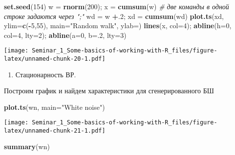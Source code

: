 \documentclass[
]{article}
\newenvironment{Shaded}{\begin{snugshade}}{\end{snugshade}}
\newcommand{\AttributeTok}[1]{\textcolor[rgb]{0.13,0.29,0.53}{#1}}
\newcommand{\CommentTok}[1]{\textcolor[rgb]{0.56,0.35,0.01}{\textit{#1}}}
\newcommand{\DecValTok}[1]{\textcolor[rgb]{0.00,0.00,0.81}{#1}}
\newcommand{\FunctionTok}[1]{\textcolor[rgb]{0.13,0.29,0.53}{\textbf{#1}}}
\newcommand{\NormalTok}[1]{#1}
\newcommand{\OtherTok}[1]{\textcolor[rgb]{0.56,0.35,0.01}{#1}}
\newcommand{\SpecialCharTok}[1]{\textcolor[rgb]{0.81,0.36,0.00}{\textbf{#1}}}
\newcommand{\StringTok}[1]{\textcolor[rgb]{0.31,0.60,0.02}{#1}}
\providecommand{\tightlist}{%
  \setlength{\itemsep}{0pt}\setlength{\parskip}{0pt}}
\begin{document}
\begin{Shaded}
\begin{Highlighting}[]
\FunctionTok{set.seed}\NormalTok{(}\DecValTok{154}\NormalTok{) }
\NormalTok{w }\OtherTok{=} \FunctionTok{rnorm}\NormalTok{(}\DecValTok{200}\NormalTok{); x }\OtherTok{=} \FunctionTok{cumsum}\NormalTok{(w) }\CommentTok{\# две команды в одной строке задаются через ";"}
\NormalTok{wd }\OtherTok{=}\NormalTok{ w }\SpecialCharTok{+}\NormalTok{.}\DecValTok{2}\NormalTok{; xd }\OtherTok{=} \FunctionTok{cumsum}\NormalTok{(wd)}
\FunctionTok{plot.ts}\NormalTok{(xd, }\AttributeTok{ylim=}\FunctionTok{c}\NormalTok{(}\SpecialCharTok{{-}}\DecValTok{5}\NormalTok{,}\DecValTok{55}\NormalTok{), }\AttributeTok{main=}\StringTok{"Random walk"}\NormalTok{, }\AttributeTok{ylab=}\StringTok{\textquotesingle{}\textquotesingle{}}\NormalTok{)}
\FunctionTok{lines}\NormalTok{(x, }\AttributeTok{col=}\DecValTok{4}\NormalTok{); }\FunctionTok{abline}\NormalTok{(}\AttributeTok{h=}\DecValTok{0}\NormalTok{, }\AttributeTok{col=}\DecValTok{4}\NormalTok{, }\AttributeTok{lty=}\DecValTok{2}\NormalTok{); }\FunctionTok{abline}\NormalTok{(}\AttributeTok{a=}\DecValTok{0}\NormalTok{, }\AttributeTok{b=}\NormalTok{.}\DecValTok{2}\NormalTok{, }\AttributeTok{lty=}\DecValTok{3}\NormalTok{)}
\end{Highlighting}
\end{Shaded}

\texttt{[image: Seminar\_1\_Some-basics-of-working-with-R\_files/figure-latex/unnamed-chunk-20-1.pdf]}

\begin{enumerate}
\def\labelenumi{\arabic{enumi}.}
\setcounter{enumi}{3}
\tightlist
\item
  Стационарность ВР.
\end{enumerate}

Построим график и найдем характеристики для сгенерированного БШ

\begin{Shaded}
\begin{Highlighting}[]
\FunctionTok{plot.ts}\NormalTok{(wn, }\AttributeTok{main=}\StringTok{"White noise"}\NormalTok{)}
\end{Highlighting}
\end{Shaded}

\texttt{[image: Seminar\_1\_Some-basics-of-working-with-R\_files/figure-latex/unnamed-chunk-21-1.pdf]}

\begin{Shaded}
\begin{Highlighting}[]
\FunctionTok{summary}\NormalTok{(wn)}
\end{Highlighting}
\end{Shaded}
\end{document}
